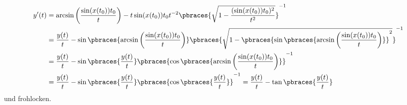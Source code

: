 \begin{solution}
\begin{itemize}
\begin{align*}
    y^\prime(t) &= \arcsin\left(\frac{\sin(x(t_0))t_0}{t}\right) - t \sin(x(t_0))t_0 t^{-2} \pbraces{\sqrt{1 - \frac{(\sin(x(t_0)) t_0)^2}{t^2}}}^{-1} \\
    &= \frac{y(t)}{t} - \sin\pbraces{\arcsin\left(\frac{\sin(x(t_0))t_0}{t}\right)} \pbraces{ \sqrt{1 - \pbraces{\sin\pbraces{\arcsin\left(\frac{\sin(x(t_0))t_0}{t}\right)}}^2} }^{-1} \\
    &= \frac{y(t)}{t} - \sin\pbraces{\frac{y(t)}{t}} \pbraces{\cos\pbraces{\arcsin\left(\frac{\sin(x(t_0))t_0}{t}\right)}}^{-1} \\
    &= \frac{y(t)}{t} - \sin\pbraces{\frac{y(t)}{t}} \pbraces{\cos\pbraces{\frac{y(t)}{t}}}^{-1} = \frac{y(t)}{t} - \tan\pbraces{\frac{y(t)}{t}}
  \end{align*}
  und frohlocken.
\end{itemize}
\end{solution}
